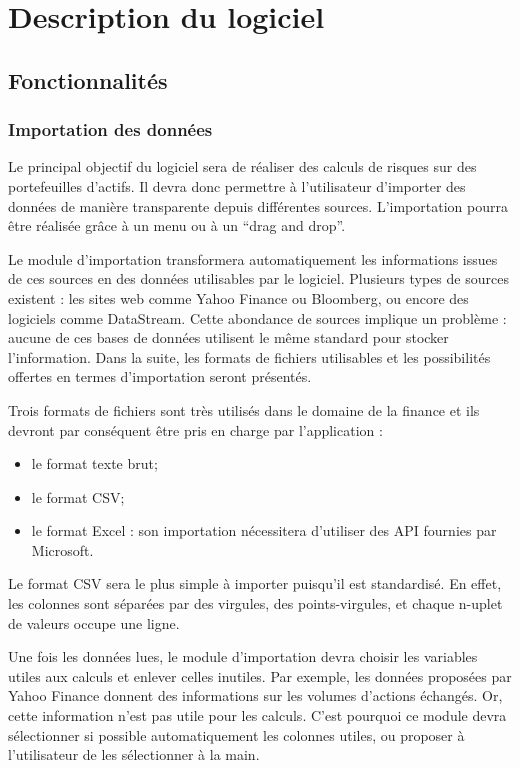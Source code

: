 \chapter{Description du logiciel}

\section{Fonctionnalités}

	\subsection{Importation des données}
		Le principal objectif du logiciel sera de réaliser des calculs de risques sur des portefeuilles d'actifs. Il devra donc permettre à l'utilisateur d'importer des données de manière transparente depuis différentes sources. L'importation pourra être réalisée grâce à un menu ou à un “drag and drop”. 

		Le module d'importation transformera automatiquement les informations issues de ces sources en des données utilisables par le logiciel. Plusieurs types de sources existent : les sites web comme Yahoo Finance ou Bloomberg, ou encore des logiciels comme DataStream. Cette abondance de sources implique un problème : aucune de ces bases de données utilisent le même standard pour stocker l'information. Dans la suite, les formats de fichiers utilisables et les possibilités offertes en termes d'importation seront présentés.

		Trois formats de fichiers sont très utilisés dans le domaine de la finance et ils devront par conséquent être pris en charge par l'application :
		\begin{itemize}
			\item le format texte brut;
			\item le format CSV;
			\item le format Excel : son importation nécessitera d'utiliser des API fournies par Microsoft.
		\end{itemize}

		Le format CSV sera le plus simple à importer puisqu'il est standardisé. En effet, les colonnes sont séparées par des virgules, des points-virgules, et chaque n-uplet de valeurs occupe une ligne.

		Une fois les données lues, le module d'importation devra choisir les variables utiles aux calculs et enlever celles inutiles. Par exemple, les données proposées par Yahoo Finance donnent des informations sur les volumes d'actions échangés. Or, cette information n'est pas utile pour les calculs. C'est pourquoi ce module devra sélectionner si possible automatiquement les colonnes utiles, ou proposer à l'utilisateur de les sélectionner à la main. 


